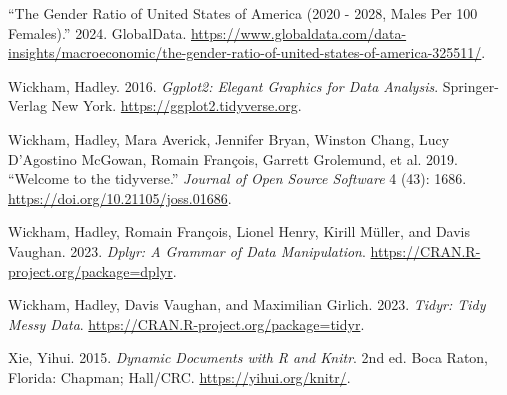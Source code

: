 \documentclass[
  letterpaper,
  DIV=11,
  numbers=noendperiod]{scrartcl}
\newlength{\cslhangindent}
\newlength{\cslentryspacingunit} %
\newenvironment{CSLReferences}[2] %
 {%
  \setlength{\parindent}{0pt}
  \ifodd #1
  \let\oldpar\par
  \def\par{\hangindent=\cslhangindent\oldpar}
  \fi
  \setlength{\parskip}{#2\cslentryspacingunit}
 }%
 {}
\begin{document}
\begin{CSLReferences}{1}{0}
\leavevmode{}%
{``The Gender Ratio of United States of America (2020 - 2028, Males Per
100 Females).''} 2024. GlobalData.
\url{https://www.globaldata.com/data-insights/macroeconomic/the-gender-ratio-of-united-states-of-america-325511/}.

\leavevmode{}%
Wickham, Hadley. 2016. \emph{Ggplot2: Elegant Graphics for Data
Analysis}. Springer-Verlag New York.
\url{https://ggplot2.tidyverse.org}.

\leavevmode{}%
Wickham, Hadley, Mara Averick, Jennifer Bryan, Winston Chang, Lucy
D'Agostino McGowan, Romain François, Garrett Grolemund, et al. 2019.
{``Welcome to the {tidyverse}.''} \emph{Journal of Open Source Software}
4 (43): 1686. \url{https://doi.org/10.21105/joss.01686}.

\leavevmode{}%
Wickham, Hadley, Romain François, Lionel Henry, Kirill Müller, and Davis
Vaughan. 2023. \emph{Dplyr: A Grammar of Data Manipulation}.
\url{https://CRAN.R-project.org/package=dplyr}.

\leavevmode{}%
Wickham, Hadley, Davis Vaughan, and Maximilian Girlich. 2023.
\emph{Tidyr: Tidy Messy Data}.
\url{https://CRAN.R-project.org/package=tidyr}.

\leavevmode{}%
Xie, Yihui. 2015. \emph{Dynamic Documents with {R} and Knitr}. 2nd ed.
Boca Raton, Florida: Chapman; Hall/CRC. \url{https://yihui.org/knitr/}.

\end{CSLReferences}
\end{document}
